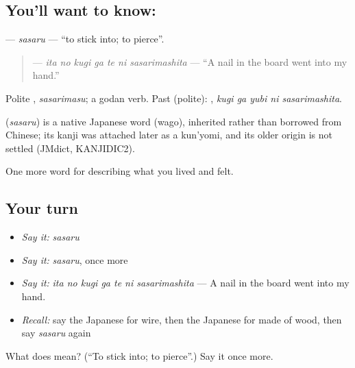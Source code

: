 \subsection*{You'll want to know: }
\textbf{} — \emph{sasaru} — \textquotedblleft{}to stick into; to pierce\textquotedblright{}.

\begin{quote}
\textbf{   } — \emph{ita no kugi ga te ni sasarimashita} — \textquotedblleft{}A nail in the board went into my hand.\textquotedblright{}
\end{quote}

Polite \textbf{}, \emph{sasarimasu}; a godan verb. Past (polite): \textbf{  }, \emph{kugi ga yubi ni sasarimashita}.

\begin{cousinweb}
\textbf{} (\emph{sasaru}) is a native Japanese word (wago), inherited rather than borrowed from Chinese; its kanji was attached later as a kun'yomi, and its older origin is not settled (JMdict, KANJIDIC2).
\end{cousinweb}

\begin{grammarlens}[title={What you've built}]
One more word for describing what you lived and felt.
\end{grammarlens}

\subsection*{Your turn}
\begin{itemize}
\raggedright
  \item \emph{Say it:} \emph{sasaru}
  \item \emph{Say it:} \emph{sasaru}, once more
  \item \emph{Say it:} \emph{ita no kugi ga te ni sasarimashita} — A nail in the board went into my hand.
  \item \emph{Recall:} say the Japanese for wire, then the Japanese for made of wood, then say \emph{sasaru} again
\end{itemize}

\begin{tcolorbox}[breakable,colback=teal!4,colframe=teal!35!black,title={Before you move on}]
What does  mean? (\textquotedblleft{}To stick into; to pierce\textquotedblright{}.) Say it once more.
\end{tcolorbox}
